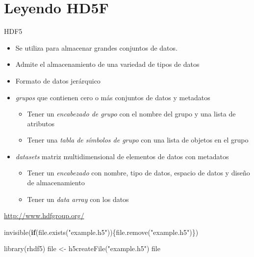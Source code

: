 \documentclass[
]{article}
\newenvironment{Shaded}{\begin{snugshade}}{\end{snugshade}}
\newcommand{\ControlFlowTok}[1]{\textcolor[rgb]{0.13,0.29,0.53}{\textbf{#1}}}
\newcommand{\FunctionTok}[1]{\textcolor[rgb]{0.00,0.00,0.00}{#1}}
\newcommand{\NormalTok}[1]{#1}
\newcommand{\OtherTok}[1]{\textcolor[rgb]{0.56,0.35,0.01}{#1}}
\newcommand{\StringTok}[1]{\textcolor[rgb]{0.31,0.60,0.02}{#1}}
\providecommand{\tightlist}{%
  \setlength{\itemsep}{0pt}\setlength{\parskip}{0pt}}
\begin{document}
\hypertarget{leyendo-hd5f}{%
\section{Leyendo HD5F}\label{leyendo-hd5f}}

HDF5

\begin{itemize}
\tightlist
\item
  Se utiliza para almacenar grandes conjuntos de datos.
\item
  Admite el almacenamiento de una variedad de tipos de datos
\item
  Formato de datos jerárquico
\item
  \emph{grupos} que contienen cero o más conjuntos de datos y metadatos

  \begin{itemize}
  \tightlist
  \item
    Tener un \emph{encabezado de grupo} con el nombre del grupo y una
    lista de atributos
  \item
    Tener una \emph{tabla de símbolos de grupo} con una lista de objetos
    en el grupo
  \end{itemize}
\item
  \emph{datasets} matriz multidimensional de elementos de datos con
  metadatos

  \begin{itemize}
  \tightlist
  \item
    Tener un \emph{encabezado} con nombre, tipo de datos, espacio de
    datos y diseño de almacenamiento
  \item
    Tener un \emph{data array} con los datos
  \end{itemize}
\end{itemize}

\url{http://www.hdfgroup.org/}

\begin{Shaded}
\begin{Highlighting}[]
\FunctionTok{invisible}\NormalTok{(}\ControlFlowTok{if}\NormalTok{(}\FunctionTok{file.exists}\NormalTok{(}\StringTok{"example.h5"}\NormalTok{))\{}\FunctionTok{file.remove}\NormalTok{(}\StringTok{"example.h5"}\NormalTok{)\})}
\end{Highlighting}
\end{Shaded}

\begin{Shaded}
\begin{Highlighting}[]
\FunctionTok{library}\NormalTok{(rhdf5)}
\NormalTok{file }\OtherTok{\textless{}{-}} \FunctionTok{h5createFile}\NormalTok{(}\StringTok{"example.h5"}\NormalTok{)}
\NormalTok{file}
\end{Highlighting}
\end{Shaded}
\end{document}
